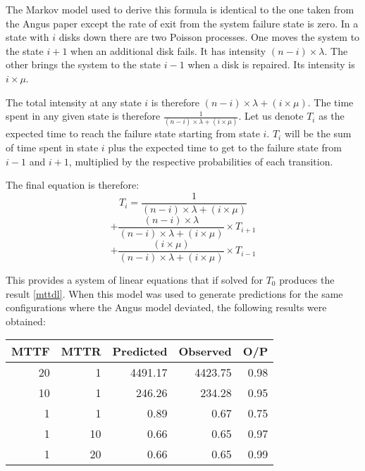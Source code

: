 \documentclass[XXX,endnotes]{usetex-v1}
\begin{document}
The Markov model used to derive this formula is identical to the one taken from the Angus paper except the rate of exit from the system failure state is zero.  In a state with $i$ disks down there are two Poisson processes.  One moves the system to the state $i+1$ when an additional disk fails.  It has intensity $(n-i) \times \lambda$.  The other brings the system to the state $i-1$ when a disk is repaired. Its intensity is $i\times\mu$.

The total intensity at any state $i$ is therefore $(n-i) \times \lambda+(i \times \mu)$.  The time spent in any given state is therefore $\frac{1}{(n-i)\times \lambda + (i \times \mu)}$.  Let us denote $T_{i}$ as the expected time to reach the failure state starting from state $i$.  $T_{i}$ will be the sum of time spent in state $i$ plus the expected time to get to the failure state from $i-1$ and $i+1$, multiplied by the respective probabilities of each transition. 

The final equation is therefore:
$$T_{i}=\frac{1}{(n-i) \times \lambda + (i \times \mu)}$$
$$+ \frac{(n-i) \times \lambda}{(n-i) \times \lambda + (i \times \mu)}\times T_{i+1}$$
$$+ \frac{(i \times \mu)}{(n-i) \times \lambda + (i \times \mu)} \times T_{i-1}$$

This provides a system of linear equations that if solved for $T_{0}$ produces the result \eqref{mttdl}.  When this model was used to generate predictions for the same configurations where the Angus model deviated, the following results were obtained:

\begin{center}
  \begin{tabular}{ | r | r | r | r | r | }
    \hline
      MTTF       & MTTR     & Predicted    & Observed  & O/P        \\ \hline
      20         & 1        & 4491.17      & 4423.75   & 0.98       \\ \hline
      10         & 1        & 246.26       & 234.28    & 0.95       \\ \hline
      1          & 1        & 0.89         & 0.67      & 0.75       \\ \hline
      1          & 10       & 0.66         & 0.65      & 0.97       \\ \hline
      1          & 20       & 0.66         & 0.65      & 0.99       \\ \hline
  \end{tabular}
\end{center}
\end{document}
